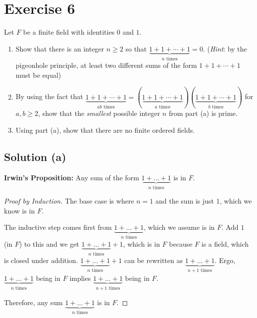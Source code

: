 \documentclass[11pt]{article}
\begin{document}
\pagebreak
\section{Exercise 6}
    Let $F$ be a finite field with identities $0$ and $1$.
    \begin{enumerate}[label=(\alph*)]
        \item 
        Show that there is an integer $n \geq 2$ so that $\underbrace{1 + 1 + \cdots + 1}_{n \text{ times}} = 0$. (\textit{Hint}: by the pigeonhole principle, at least two different sums of the form $1 + 1 + \cdots + 1$ must be equal)

        \item 
        By using the fact that $\underbrace{1 + 1 + \cdots + 1}_{ab \text{ times}} = (\underbrace{1 + 1 + \cdots + 1}_{a \text{ times}})(\underbrace{1 + 1 + \cdots + 1}_{b \text{ times}})$ for $a, b \geq 2$, show that the \textit{smallest} possible integer $n$ from part (a) is prime.

        \item 
        Using part (a), show that there are no finite ordered fields.
        
    \end{enumerate}

    \subsection{Solution (a)}
    \textbf{Irwin's Proposition: } Any sum of the form $\underbrace{1 + \dots + 1}_{n \text{ times}}$ is in $F$.
    \begin{proof}[Proof by Induction]
        The base case is where $n = 1$ and the sum is just $1$, which we know is in $F$.
        
        The inductive step comes first from $\underbrace{1 + \dots + 1}_{n \text{ times}}$, which we assume is in $F$.
        Add $1$ (in $F$) to this and we get $\underbrace{1 + \dots + 1}_{n \text{ times}} + 1$, which is in $F$ because $F$ is a field, which is closed under addition.
        $\underbrace{1 + \dots + 1}_{n \text{ times}} + 1$ can be rewritten as $\underbrace{1 + \dots + 1}_{n + 1 \text{ times}}$.
        Ergo, $\underbrace{1 + \dots + 1}_{n \text{ times}}$ being in $F$ implies $\underbrace{1 + \dots + 1}_{n + 1 \text{ times}}$ being in $F$.

        Therefore, any sum $\underbrace{1 + \dots + 1}_{n \text{ times}}$ is in $F$.
    \end{proof}
\end{document}
